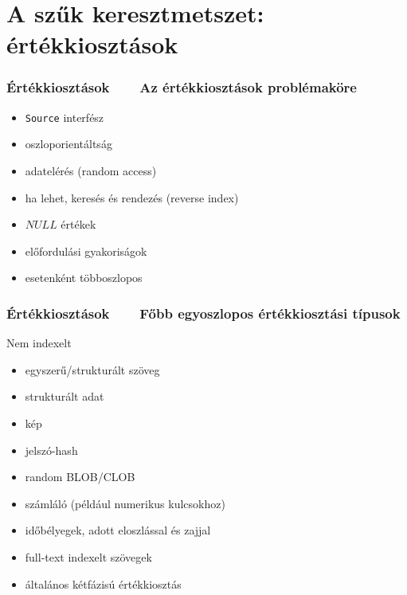 \documentclass[
]{beamer}
\newcommand{\slidetitle}[2]{\frametitle{{\small #1 ~ \ding{226} ~ } \normalsize \textbf{#2} }}
\begin{document}
\section{A szűk keresztmetszet: értékkiosztások}
\def\sectionshorttitle{Értékkiosztások}

\begin{frame}
    \slidetitle{\sectionshorttitle}{Az értékkiosztások problémaköre}
    
    \begin{itemize}
        \setlength\itemsep{1em}
        \item \texttt{Source} interfész
        \item oszloporientáltság
        \item adatelérés (random access)
        \item ha lehet, keresés és rendezés (reverse index)
        \item $NULL$ értékek
        \item előfordulási gyakoriságok
        \item esetenként többoszlopos
    \end{itemize}
\end{frame}

\begin{frame}
    \slidetitle{\sectionshorttitle}{Főbb egyoszlopos értékkiosztási típusok}

    {\color{beamer@blendedblue}Nem indexelt}
    
    \begin{itemize}
        \item egyszerű/strukturált szöveg
        \item strukturált adat
        \item kép
        \item jelszó-hash
        \item random BLOB/CLOB
    \end{itemize}
    
    \vspace{0.4cm}
    
    
    \begin{itemize}
        \item számláló (például numerikus kulcsokhoz)
        \item időbélyegek, adott eloszlással és zajjal
        \item full-text indexelt szövegek
        \item {  { általános kétfázisú értékkiosztás } }
    \end{itemize}
    
\end{frame}
\end{document}
